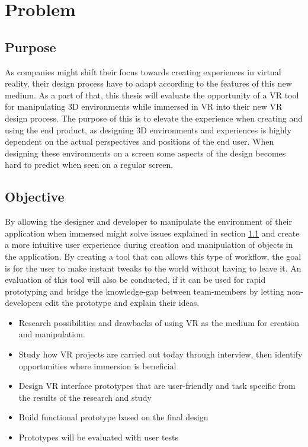 \section{Problem}

\subsection{Purpose}
\label{intro:purpose}
As companies might shift their focus towards creating experiences in virtual reality, their design process have to adapt according to the features of this new medium. As a part of that, this thesis will evaluate the opportunity of a VR tool for manipulating 3D environments while immersed in VR into their new VR design process. The purpose of this is to elevate the experience when creating and using the end product, as designing 3D environments and experiences is highly dependent on the actual perspectives and positions of the end user. When designing these environments on a screen some aspects of the design becomes hard to predict when seen on a regular screen.

\subsection{Objective}
By allowing the designer and developer to manipulate the environment of their application when immersed might solve issues explained in section \ref{intro:purpose} and create a more intuitive user experience during creation and manipulation of objects in the application. By creating a tool that can allows this type of workflow, the goal is for the user to make instant tweaks to the world without having to leave it. An evaluation of this tool will also be conducted, if it can be used for rapid prototyping and bridge the knowledge-gap between team-members by letting non-developers edit the prototype and explain their ideas.


\begin{itemize}
	\item Research possibilities and drawbacks of using VR as the medium for creation and manipulation.
	\item Study how VR projects are carried out today through interview, then identify opportunities where immersion is beneficial
	\item Design VR interface prototypes that are user-friendly and task specific from the results of the research and study
	\item Build functional prototype based on the final design
	\item Prototypes will be evaluated with user tests
\end{itemize}

